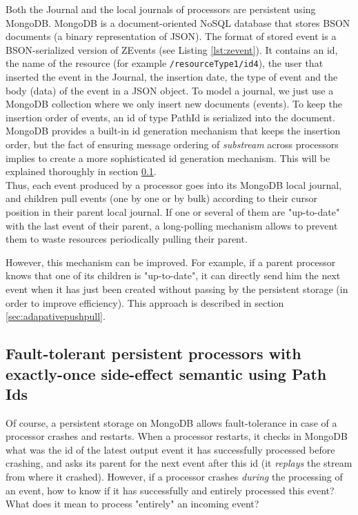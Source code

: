Both the Journal and the local journals of processors are persistent using MongoDB. MongoDB is a document-oriented NoSQL database  that stores BSON documents (a binary representation of JSON). The format of stored event is a BSON-serialized version of ZEvents (see Listing \ref{lst:zevent}). It contains an id, the name of the resource (for example \verb|/resourceType1/id4|), the user that inserted the event in the Journal, the insertion date, the type of event and the body (data) of the event in a JSON object. To model a journal, we just use a MongoDB collection where we only insert new documents (events). To keep the insertion order of events, an id of type PathId is serialized
into the document. MongoDB provides a built-in id generation mechanism that keeps the insertion order, but the fact of ensuring message ordering of \textit{substream} across processors implies to create a more sophisticated id generation mechanism. This will be explained thoroughly in section \ref{sec:substreamproblem}.
\\

Thus, each event produced by a processor goes into its MongoDB local journal, and children pull events (one by one or by bulk) according to their cursor position in their parent
local journal. If one or several of them are "up-to-date" with the last event of their parent, a long-polling mechanism allows to prevent them to waste resources periodically pulling their parent.

However, this mechanism can be improved. For example, if a parent processor knows that one of its children is "up-to-date", it can directly send him the next event when it has just been created without passing by the persistent storage (in order to improve efficiency). This approach is described in section \ref{sec:adapativepushpull}.

\subsection{Fault-tolerant persistent processors with exactly-once side-effect semantic using Path Ids}
\label{sec:substreamproblem}

Of course, a persistent storage on MongoDB allows fault-tolerance in case of a processor crashes and restarts. When a processor restarts, it checks in MongoDB what was the id of the latest output event it has successfully processed before crashing, and asks its parent for the next event after this id (it \textit{replays} the stream from where it crashed).
However, if a processor crashes \textit{during} the processing of an event, how to know if it has successfully and entirely processed this event? What does it mean to process "entirely" an incoming event?
\\

